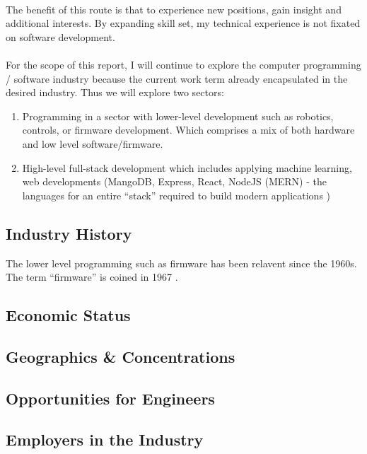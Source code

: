 \documentclass[10pt,letterpaper]{article}
\begin{document}
\\
The benefit of this route is that to experience new positions, gain insight and additional interests. By expanding skill set, my technical experience is not fixated on software development.\\
\\
For the scope of this report, I will continue to explore the computer programming / software industry because the current work term already encapsulated in the desired industry\cite{coop-handbook}. Thus we will explore two sectors:
\begin{enumerate}
	\item
	      Programming in a sector with lower-level development such as robotics, controls, or firmware development. Which comprises a mix of both hardware and low level software/firmware.

	\item
	      High-level full-stack development which includes applying machine learning, web developments (MangoDB, Express, React, NodeJS (MERN) - the languages for an entire ``stack'' required to build modern applications \cite{mern})
\end{enumerate}

\subsection{Industry History}
The lower level programming such as firmware has been relavent since the 1960s. The term ``firmware'' is coined in 1967 \cite{firmware-term}.

\subsection{Economic Status}

\subsection{Geographics \& Concentrations}

\subsection{Opportunities for Engineers}

\subsection{Employers in the Industry}
\end{document}

